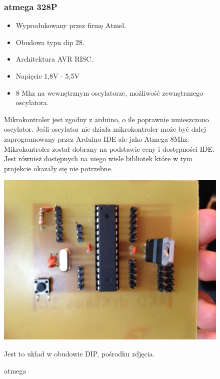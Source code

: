 \documentclass[a4paper,11pt]{article}
\def\SCALE{0.6}
\begin{document}
\begin{figure}[H]
	\subsubsection{atmega 328P}
		\begin{itemize}
			\item Wyprodukowany przez firmę Atmel.
			\item Obudowa typu dip 28.
			\item Architektura AVR RISC.
			\item Napięcie 1,8V - 5,5V
			\item 8 Mhz na wewnętrznym oscylatorze, możliwość zewnętrznego oscylatora.
		\end{itemize}
	Mikrokontroler jest zgodny z arduino, o ile poprawnie umieszczono oscylator. Jeśli oscylator nie działa mikrokontroler może być dalej zaprogramowany przez	Arduino IDE ale jako Atmega 8Mhz. Mikrokontroler został dobrany na podstawie ceny i dostępności IDE. Jest również dostępnych na niego wiele bibliotek które w tym projekcie okazały się nie potrzebne.
	
	\centering
	\includegraphics[width=\SCALE
	\paperwidth]{plytkaGotowa}
	\caption{atmega}
	Jest to układ w obudowie DIP, pośrodku zdjęcia.
\end{figure}
\end{document}
